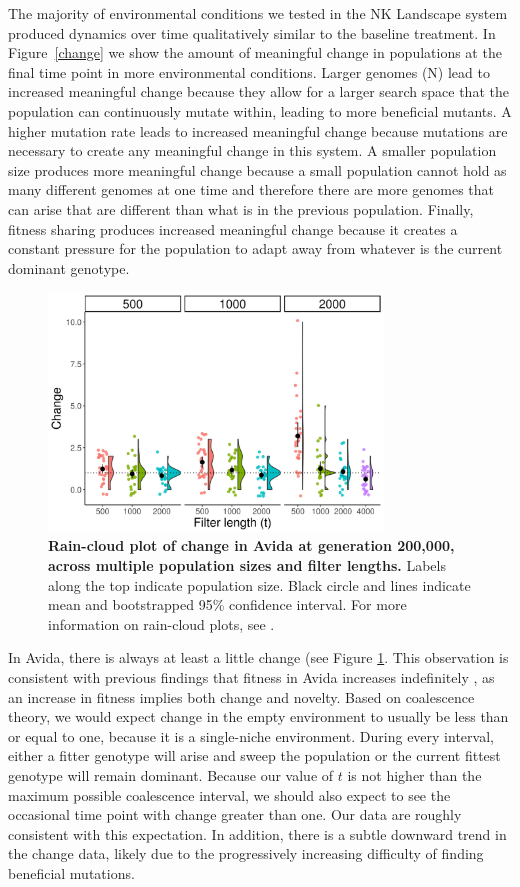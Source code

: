 \documentclass[letterpaper]{article}
\begin{document}
The majority of environmental conditions we tested in the NK Landscape system produced dynamics over time qualitatively similar to the baseline treatment. In Figure~\ref{change} we show the amount of meaningful change in populations at the final time point in more environmental conditions. Larger genomes (N) lead to increased meaningful change because they allow for a larger search space that the population can continuously mutate within, leading to more beneficial mutants. A higher mutation rate leads to increased meaningful change because mutations are necessary to create any meaningful change in this system. A smaller population size produces more meaningful change because a small population cannot hold as many different genomes at one time and therefore there are more genomes that can arise that are different than what is in the previous population. Finally, fitness sharing produces increased meaningful change because it creates a constant pressure for the population to adapt away from whatever is the current dominant genotype.

\begin{figure}
    \centering
    \includegraphics[width=3.5in]{figs/avida_filter_change_end.png}
    \caption{\textbf{Rain-cloud plot of change in Avida at generation 200,000, across multiple population sizes and filter lengths.} Labels along the top indicate population size. Black circle and lines indicate mean and bootstrapped 95\% confidence interval. For more information on rain-cloud plots, see \citep{allen_raincloud_2018}.}
    \label{fig:avida_filter_change}
\end{figure}

In Avida, there is always at least a little change (see Figure \ref{fig:avida_filter_change}. This observation is consistent with previous findings that fitness in Avida increases indefinitely \citep{wiser_analysis_2015}, as an increase in fitness implies both change and novelty. Based on coalescence theory, we would expect change in the empty environment to usually be less than or equal to one, because it is a single-niche environment. During every interval, either a fitter genotype will arise and sweep the population or the current fittest genotype will remain dominant. Because our value of $t$ is not higher than the maximum possible coalescence interval, we should also expect to see the occasional time point with change greater than one. Our data are roughly consistent with this expectation. In addition, there is a subtle downward trend in the change data, likely due to the progressively increasing difficulty of finding beneficial mutations.
\end{document}
